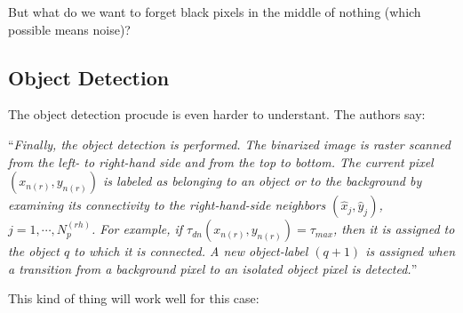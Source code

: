 \documentclass[11pt]{article}
\begin{document}
    But what do we want to forget black pixels in the middle of nothing
(which possible means noise)?

\hypertarget{object-detection}{%
\subsection{Object Detection}\label{object-detection}}

The object detection procude is even harder to understant. The authors
say:

``\emph{Finally, the object detection is performed. The binarized image
is raster scanned from the left- to right-hand side and from the top to
bottom. The current pixel \((x_{n(r)}, y_{n(r)})\) is labeled as
belonging to an object or to the background by examining its
connectivity to the right-hand-side neighbors
\((\hat{x}_j, \hat{y}_j)\), \(j = 1,\cdots, N_p^{(rh)}\). For example,
if \(\tau_{dn}(x_{n(r)}, y_{n(r)}) = \tau_{max}\), then it is assigned
to the object \(q\) to which it is connected. A new object-label
\((q+1)\) is assigned when a transition from a background pixel to an
isolated object pixel is detected.}''

This kind of thing will work well for this case:
\end{document}
